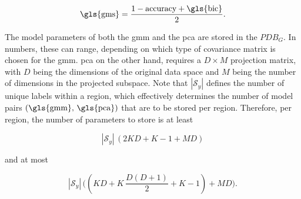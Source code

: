 \documentclass[../../main.tex]{subfiles}
\begin{document}
 \begin{equation}\label{eq:combined_metric}
    \text{\gls{gms}} = \frac{1 - \text{accuracy} + \text{\gls{bic}}}{2}.
 \end{equation}
 
 The model parameters of both the \gls{gmm} and the \gls{pca} are stored in the $PDB_G$. In numbers, these can range, depending on which type of covariance matrix is chosen for the \gls{gmm}. \Acrshort{pca} on the other hand, requires a $D \times M$ projection matrix, with $D$ being the dimensions of the original data space and $M$ being the number of dimensions in the projected subspace. Note that $|\mathcal{S}_y|$ defines the number of unique labels within a region, which effectively determines the number of model pairs $(\text{\gls{gmm}, \gls{pca}})$ that are to be stored per region. Therefore, per region, the number of parameters to store is at least
 
 \begin{equation*}
    |\mathcal{S}_y| \, ( 2KD +K-1 + MD  )
 \end{equation*}

 and at most

 \begin{equation*}
    |\mathcal{S}_y| \, \bigl( (KD + K \, \frac{D(D+1)}{2}+K-1) + MD \bigr).
 \end{equation*}
\end{document}
